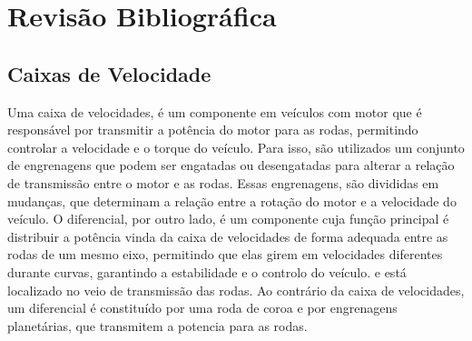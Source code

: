 \chapter{Revisão Bibliográfica} \label{ch:soa}
\setlength{\headheight}{13.6pt}
\section{Caixas de Velocidade} \label{sec:soa_caixas}
Uma caixa de velocidades, é um componente em veículos com motor que é responsável por transmitir a potência do motor para as rodas, permitindo controlar a velocidade e o torque do veículo. Para isso, são utilizados um conjunto de engrenagens que podem ser engatadas ou desengatadas para alterar a relação de transmissão entre o motor e as rodas. Essas engrenagens, são divididas em mudanças, que determinam a relação entre a rotação do motor e a velocidade do veículo. O diferencial, por outro lado, é um componente cuja função principal é distribuir a potência vinda da caixa de velocidades de forma adequada entre as rodas de um mesmo eixo, permitindo que elas girem em velocidades diferentes durante curvas, garantindo a estabilidade e o controlo do veículo. e está localizado no veio de transmissão das rodas. Ao contrário da caixa de velocidades, um diferencial é constituído por uma roda de coroa e por engrenagens planetárias, que transmitem a potencia para as rodas.
